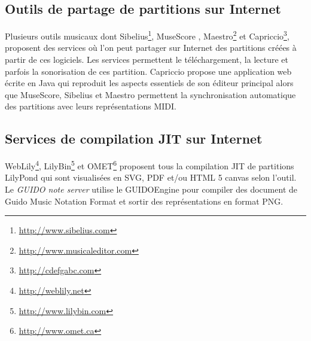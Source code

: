 \documentclass{article}
\begin{document}
\subsection{Outils de partage de partitions sur Internet}\label{subsection:sharing}
Plusieurs outils musicaux dont Sibelius\footnote{\url{http://www.sibelius.com}}, Muse\-Score \cite{musescore}, Maestro\footnote{\url{http://www.musicaleditor.com}} et Capriccio\footnote{\url{http://cdefgabc.com}}, proposent des services où l'on peut partager sur Internet des partitions créées à partir de ces logiciels. Les services permettent le téléchargement, la lecture et parfois la sonorisation de ces partition. Capriccio propose une application web écrite en Java qui reproduit les aspects essentiels de son éditeur principal alors que MuseScore, Sibelius et Maestro permettent la synchronisation automatique des partitions avec leurs représentations MIDI.
\subsection{Services de compilation JIT sur Internet}\label{subsection:jit}
WebLily\footnote{\url{http://weblily.net}}, LilyBin\footnote{\url{http://www.lilybin.com}} et OMET\footnote{\url{http://www.omet.ca}} proposent tous la compilation JIT de partitions LilyPond qui sont visualisées en SVG, PDF et/ou HTML 5 canvas selon l'outil. Le \emph{GUIDO note server} \cite{renz98} utilise le GUIDOEngine pour compiler des document de Guido Music Notation Format \cite{hoos98} et sortir des représentations en format PNG.
\end{document}
